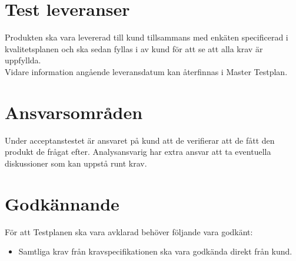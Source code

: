 \documentclass[10pt]{article}
\begin{document}
\section{Test leveranser }
	Produkten ska vara levererad till kund tillsammans med enkäten specificerad i kvalitetsplanen och ska sedan fyllas i av kund för att se att alla krav är uppfyllda.
\\	
	Vidare information angående leveransdatum kan återfinnas i Master Testplan.
	

	
\section{Ansvarsområden}
	Under acceptanstestet är ansvaret på kund att de verifierar att de fått den produkt de frågat efter. Analysansvarig har extra ansvar att ta eventuella diskussioner som kan uppstå runt krav.
	

	

	
	
\section{Godkännande}
	För att Testplanen ska vara avklarad behöver följande vara godkänt:
	\begin{itemize}
	 \item Samtliga krav från kravspecifikationen ska vara godkända direkt från kund.
	\end{itemize}
	


\printbibliography
\end{document}
